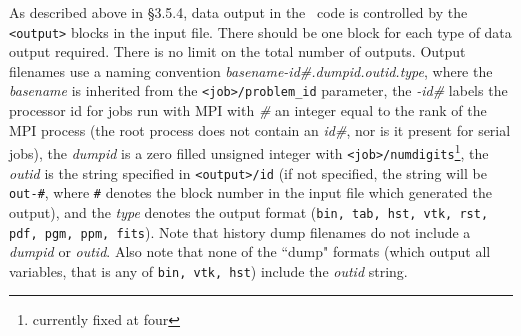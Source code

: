 As described above in \S 3.5.4, data output in the \ath\ code is
controlled by the {\tt <output>} blocks in the input file.  There should
be one block for each type of data output required.  There is no limit on
the total number of outputs.  Output filenames use a naming convention
{\it basename-id\#.dumpid.outid.type}, where the {\it basename} is inherited
from the {\tt <job>/problem\_id} parameter, the {\it -id\#} labels the
processor id for jobs run with MPI with {\it \#} an integer equal to the rank
of the MPI process (the root process does not contain an
{\it id\#}, nor is it present for serial jobs), the {\it dumpid} is a zero
filled unsigned integer with {\tt <job>/numdigits}\footnote{currently
fixed at four}, the {\it outid} is the string specified in {\tt <output>/id}
(if not specified, the string will be {\tt out-\#}, where {\tt \#}
denotes the block number in the input
file which generated the output), and the {\it type}
denotes the output format ({\tt bin, tab, hst, vtk, rst, pdf, pgm, ppm, fits}).
Note that history dump filenames do not include a {\it dumpid} or
{\it outid}.  Also note that none of the ``dump" formats (which output
all variables, that is any of {\tt bin, vtk, hst}) include the {\it outid}
string. 


